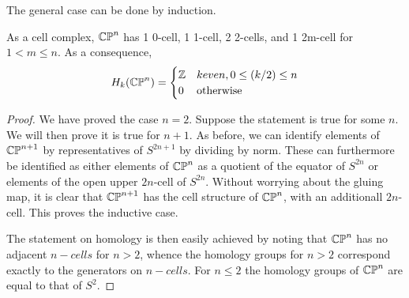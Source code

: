 The general case can be done by induction.

\begin{theorem}
As a cell complex, $\mathbb{CP}^{n}$ has 1 0-cell, 1 1-cell, 2 2-cells, and 1 2m-cell for $1<m\leq n$. As a consequence,
$$H_k(\mathbb{CP}^{n})=\begin{cases} 
      \mathbb{Z} & k even, 0\leq (k/2)\leq n \\
      0 & \text{otherwise}
   \end{cases}
$$
\end{theorem}
\begin{proof}
We have proved the case $n=2$. Suppose the statement is true for some $n$. We will then prove it is true for $n+1$. As before, we can identify elements of $\mathbb{CP}^{n+1}$ by representatives of $S^{2n+1}$ by dividing by norm. These can furthermore be identified as either elements of $\mathbb{CP}^{n}$ as a quotient of the equator of $S^{2n}$ or elements of the open upper $2n$-cell of $S^{2n}$. Without worrying about the gluing map, it is clear that $\mathbb{CP}^{n+1}$ has the cell structure of $\mathbb{CP}^{n}$, with an additionall $2n$-cell. This proves the inductive case.

The statement on homology is then easily achieved by noting that $\mathbb{CP}^{n}$ has no adjacent $n-cells$ for $n>2$, whence the homology groups for $n>2$ correspond exactly to the generators on $n-cells$. For $n\leq 2$ the homology groups of $\mathbb{CP}^{n}$ are equal to that of $S^2$.
\end{proof}